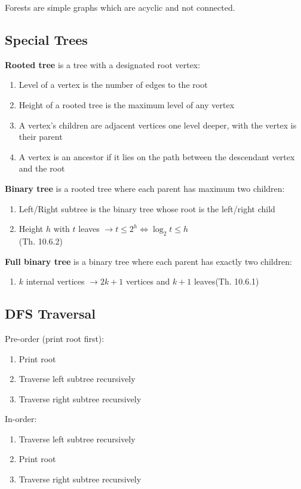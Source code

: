 \documentclass[12pt, a4paper]{article}
\begin{document}
\begin{multicols*}{3}
Forests are simple graphs which are acyclic and not connected.

\subsection{Special Trees}
\textbf{Rooted tree} is a tree with a designated root vertex:
\begin{enumerate}[\roman*.]
  \item Level of a vertex is the number of edges to the root 
  \item Height of a rooted tree is the maximum level of any vertex
  \item A vertex's children are adjacent vertices one level deeper, with the vertex is their parent
  \item A vertex is an ancestor if it lies on the path between the descendant vertex and the root
\end{enumerate}

\textbf{Binary tree} is a rooted tree where each parent has maximum two children:
\begin{enumerate}[\roman*.]
  \item Left/Right subtree is the binary tree whose root is the left/right child
  \item Height $h$ with $t$ leaves $\rightarrow t \leq 2^h \iff \log_2t \leq h$\\\hfill(Th. 10.6.2)
\end{enumerate}
\textbf{Full binary tree} is a binary tree where each parent has exactly two children:
\begin{enumerate}[\roman*.]
  \item $k$ internal vertices $\rightarrow 2k+1$ vertices and $k+1$ leaves\hfill(Th. 10.6.1) 
\end{enumerate}
\colbreak

\subsection{DFS Traversal}
Pre-order (print root first):
\begin{enumerate}[\roman*.]
  \item Print root
  \item Traverse left subtree recursively
  \item Traverse right subtree recursively
\end{enumerate}

In-order:
\begin{enumerate}[\roman*.]
  \item Traverse left subtree recursively
  \item Print root
  \item Traverse right subtree recursively
\end{enumerate}


\end{multicols*}
\end{document}
